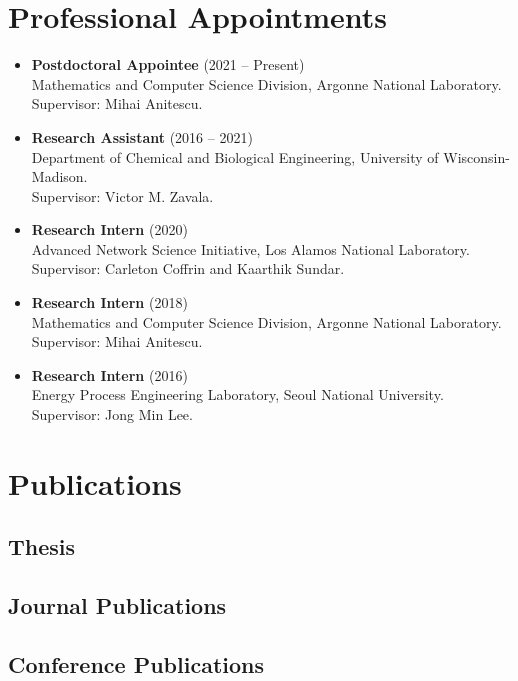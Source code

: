 \documentclass{article}
\begin{document}
\section*{Professional Appointments}
\begin{itemize}[leftmargin=*]
\item[] {\bf Postdoctoral Appointee} (2021 -- Present)\\
  Mathematics and Computer Science Division, Argonne National Laboratory. \\
  Supervisor: Mihai Anitescu.
\item[] {\bf Research Assistant} (2016 -- 2021)\\
  Department of Chemical and Biological Engineering, University of Wisconsin-Madison. \\
  Supervisor: Victor M. Zavala.
\item[] {\bf Research Intern} (2020)\\
  Advanced Network Science Initiative, Los Alamos National Laboratory. \\
  Supervisor: Carleton Coffrin and Kaarthik Sundar.
\item[] {\bf Research Intern} (2018)\\
  Mathematics and Computer Science Division, Argonne National Laboratory. \\
  Supervisor: Mihai Anitescu.
\item[] {\bf Research Intern} (2016)\\
  Energy Process Engineering Laboratory, Seoul National University. \\
  Supervisor: Jong Min Lee.
\end{itemize}

\section*{Publications}
\subsection*{Thesis}
\renewcommand*{\labelenumi}{[T\theenumi]}
\subsection*{Journal Publications}
\renewcommand*{\labelenumi}{[J\theenumi]}
\subsection*{Conference Publications}
\renewcommand*{\labelenumi}{[C\theenumi]}
\end{document}
